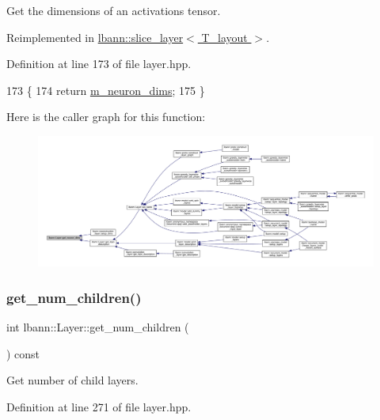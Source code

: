 Get the dimensions of an activations tensor. 

Reimplemented in \hyperlink{classlbann_1_1slice__layer_a824178abe2450bd331304ab0d50214ce}{lbann\+::slice\+\_\+layer$<$ T\+\_\+layout $>$}.



Definition at line 173 of file layer.\+hpp.


\begin{DoxyCode}
173                                                                     \{
174     \textcolor{keywordflow}{return} \hyperlink{classlbann_1_1Layer_abb34bb8031f57a483e2e327a5f229f48}{m\_neuron\_dims};
175   \}
\end{DoxyCode}
Here is the caller graph for this function\+:\nopagebreak
\begin{figure}[H]
\begin{center}
\leavevmode
\includegraphics[width=350pt]{classlbann_1_1Layer_a54f53393fadbfdc73b4e72489c868433_icgraph}
\end{center}
\end{figure}
\mbox{\label{classlbann_1_1Layer_a1409a117c31a7ea4f2c7a4d22a3e86c3}} 
\subsubsection{\texorpdfstring{get\+\_\+num\+\_\+children()}{get\_num\_children()}}
{\footnotesize\ttfamily int lbann\+::\+Layer\+::get\+\_\+num\+\_\+children (\begin{DoxyParamCaption}{ }\end{DoxyParamCaption}) const\hspace{0.3cm}{\ttfamily [inline]}}

Get number of child layers. 

Definition at line 271 of file layer.\+hpp.


